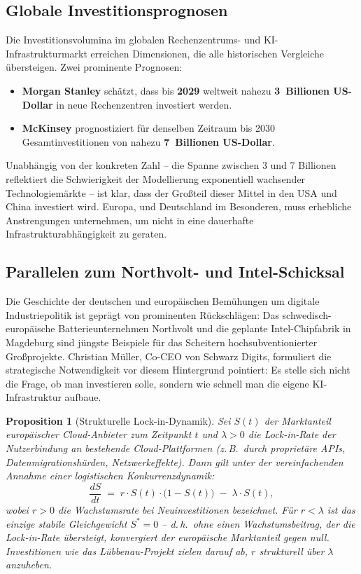 ﻿\documentclass[12pt, a4paper, openany]{report}
\newtheorem{proposition}[theorem]{Proposition}
\begin{document}
\subsection{Globale Investitionsprognosen}

Die Investitionsvolumina im globalen Rechenzentrums- und KI-Infrastrukturmarkt
erreichen Dimensionen, die alle historischen Vergleiche übersteigen. Zwei
prominente Prognosen:

\begin{itemize}[leftmargin=2em]
	\item \textbf{Morgan Stanley} schätzt, dass bis \textbf{2029} weltweit
	nahezu \textbf{3~Billionen US-Dollar} in neue Rechenzentren investiert
	werden.
	\item \textbf{McKinsey} prognostiziert für denselben Zeitraum bis 2030
	Gesamtinvestitionen von nahezu \textbf{7~Billionen US-Dollar}.
\end{itemize}

\noindent
Unabhängig von der konkreten Zahl -- die Spanne zwischen 3 und 7 Billionen
reflektiert die Schwierigkeit der Modellierung exponentiell wachsender
Technologiemärkte -- ist klar, dass der Großteil dieser Mittel in den USA
und China investiert wird. Europa, und Deutschland im Besonderen, muss
erhebliche Anstrengungen unternehmen, um nicht in eine dauerhafte
Infrastrukturabhängigkeit zu geraten.

\subsection{Parallelen zum Northvolt- und Intel-Schicksal}

Die Geschichte der deutschen und europäischen Bemühungen um digitale
Industriepolitik ist geprägt von prominenten Rückschlägen: Das
schwedisch-europäische Batterieunternehmen Northvolt und die geplante
Intel-Chipfabrik in Magdeburg sind jüngste Beispiele für das Scheitern
hochsubventionierter Großprojekte. Christian Müller, Co-CEO von Schwarz
Digits, formuliert die strategische Notwendigkeit vor diesem Hintergrund
pointiert: Es stelle sich nicht die Frage, ob man investieren solle,
sondern wie schnell man die eigene KI-Infrastruktur aufbaue.

\begin{proposition}[Strukturelle Lock-in-Dynamik]
	\label{prop:lockin}
	Sei $S(t)$ der Marktanteil europäischer Cloud-Anbieter zum Zeitpunkt $t$ und
	$\lambda > 0$ die Lock-in-Rate der Nutzerbindung an bestehende
	Cloud-Plattformen (z.\,B.\ durch proprietäre APIs, Datenmigrationshürden,
	Netzwerkeffekte). Dann gilt unter der vereinfachenden Annahme einer
	logistischen Konkurrenzdynamik:
	\[
	\frac{dS}{dt} \;=\; r \cdot S(t)\cdot\bigl(1 - S(t)\bigr)
	\;-\; \lambda \cdot S(t),
	\]
	wobei $r > 0$ die Wachstumsrate bei Neuinvestitionen bezeichnet.
	Für $r < \lambda$ ist das einzige stabile Gleichgewicht $S^* = 0$ --
	d.\,h.\ ohne einen Wachstumsbeitrag, der die Lock-in-Rate übersteigt,
	konvergiert der europäische Marktanteil gegen null. Investitionen wie
	das Lübbenau-Projekt zielen darauf ab, $r$ strukturell über $\lambda$
	anzuheben.
\end{proposition}
\end{document}
